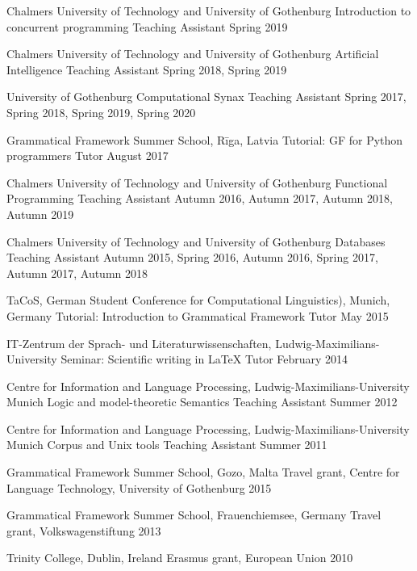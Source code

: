 \documentclass[11pt, a4]{academic-cv}
\begin{document}
\begin{cventries}
\cventry
{Chalmers University of Technology and University of Gothenburg}
{Introduction to concurrent programming}
{Teaching Assistant}
{}
{Spring 2019}

\cventry
{Chalmers University of Technology and University of Gothenburg}
{Artificial Intelligence}
{Teaching Assistant}
{}
{Spring 2018, Spring 2019}

\cventry
{University of Gothenburg}
{Computational Synax}
{Teaching Assistant}
{}
{Spring 2017, Spring 2018, Spring 2019, Spring 2020}

\cventry
{Grammatical Framework Summer School, Rīga, Latvia}
{Tutorial: GF for Python programmers}
{Tutor}
{}
{August 2017}

\cventry
{Chalmers University of Technology and University of Gothenburg}
{Functional Programming}
{Teaching Assistant}
{}
{Autumn 2016, Autumn 2017, Autumn 2018, Autumn 2019}

\cventry
{Chalmers University of Technology and University of Gothenburg}
{Databases}
{Teaching Assistant}
{}
{Autumn 2015, Spring 2016, Autumn 2016, Spring 2017, Autumn 2017, Autumn 2018}

\cventry
{TaCoS, German Student Conference for Computational Linguistics), Munich, Germany}
{Tutorial: Introduction to Grammatical Framework}
{Tutor}
{}
{May 2015}

\cventry
{IT-Zentrum der Sprach- und Literaturwissenschaften, Ludwig-Maximilians-University}
{Seminar: Scientific writing in LaTeX}
{Tutor}
{}
{February 2014}

\cventry
{Centre for Information and Language Processing, Ludwig-Maximilians-University Munich}
{Logic and model-theoretic Semantics}
{Teaching Assistant}
{}
{Summer 2012}

\cventry
{Centre for Information and Language Processing, Ludwig-Maximilians-University Munich}
{Corpus and Unix tools}
{Teaching Assistant}
{}
{Summer 2011}

\end{cventries}
\vspace{-10px}

\begin{cvhonors}
\cvhonor
{Grammatical Framework Summer School, Gozo, Malta}
{\newline
Travel grant, Centre for Language Technology, University of Gothenburg}
{}
{2015}

\cvhonor
{Grammatical Framework Summer School, Frauenchiemsee, Germany}
{\newline
Travel grant, Volkswagenstiftung}
{}
{2013}

\cvhonor
{Trinity College, Dublin, Ireland}
{\newline
Erasmus grant, European Union}
{}
{2010}
\end{cvhonors}
\vspace{-10px}
\end{document}
